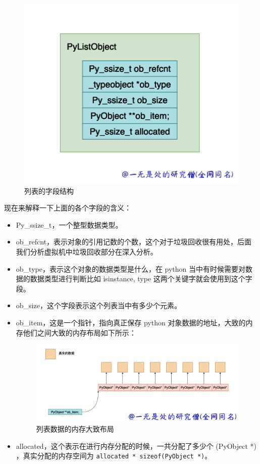     \begin{figure}[H]
        \centering
            \includegraphics[scale=.5]{images/01-list.png}
            \caption{列表的字段结构}
        \label{fig:my_label}
    \end{figure}
    
现在来解释一下上面的各个字段的含义：
\begin{itemize}
\item Py\_ssize\_t，一个整型数据类型。 
\item ob\_refcnt，表示对象的引用记数的个数，这个对于垃圾回收很有用处，后面我们分析虚拟机中垃圾回收部分在深入分析。 
\item ob\_type，表示这个对象的数据类型是什么，在 python 当中有时候需要对数据的数据类型进行判断比如 isinstance, type 这两个关键字就会使用到这个字段。 
\item ob\_size，这个字段表示这个列表当中有多少个元素。 
\item ob\_item，这是一个指针，指向真正保存 python 对象数据的地址，大致的内存他们之间大致的内存布局如下所示： 

    \begin{figure}[H]
        \centering
            \includegraphics[scale=.3]{images/02-list.png}
        \caption{列表数据的内存大致布局}
        \label{fig:my_label}
    \end{figure}
    
\item allocated，这个表示在进行内存分配的时候，一共分配了多少个 (PyObject *) ，真实分配的内存空间为 \verb|allocated * sizeof(PyObject *)|。 
\end{itemize}
